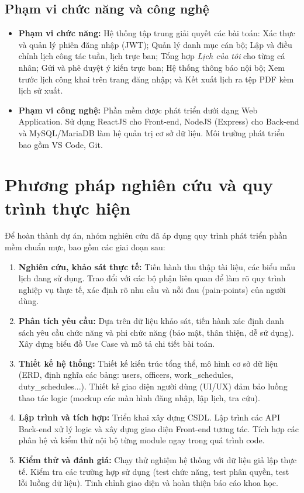 \documentclass[18pt,a4paper]{report}
\begin{document}
\subsection{Phạm vi chức năng và công nghệ}
\begin{itemize}[leftmargin=1.2cm]
    \item \textbf{Phạm vi chức năng:} Hệ thống tập trung giải quyết các bài toán: Xác thực và quản lý phiên đăng nhập (JWT); Quản lý danh mục cán bộ; Lập và điều chỉnh lịch công tác tuần, lịch trực ban; Tổng hợp \textit{Lịch của tôi} cho từng cá nhân; Gửi và phê duyệt ý kiến trực ban; Hệ thống thông báo nội bộ; Xem trước lịch công khai trên trang đăng nhập; và Kết xuất lịch ra tệp PDF kèm lịch sử xuất.
    \item \textbf{Phạm vi công nghệ:} Phần mềm được phát triển dưới dạng Web Application. Sử dụng ReactJS cho Front-end, NodeJS (Express) cho Back-end và MySQL/MariaDB làm hệ quản trị cơ sở dữ liệu. Môi trường phát triển bao gồm VS Code, Git.
\end{itemize}

\section{Phương pháp nghiên cứu và quy trình thực hiện}
Để hoàn thành dự án, nhóm nghiên cứu đã áp dụng quy trình phát triển phần mềm chuẩn mực, bao gồm các giai đoạn sau:
\begin{enumerate}[leftmargin=1.2cm]
    \item \textbf{Nghiên cứu, khảo sát thực tế:} Tiến hành thu thập tài liệu, các biểu mẫu lịch đang sử dụng. Trao đổi với các bộ phận liên quan để làm rõ quy trình nghiệp vụ thực tế, xác định rõ nhu cầu và nỗi đau (pain-points) của người dùng.
    \item \textbf{Phân tích yêu cầu:} Dựa trên dữ liệu khảo sát, tiến hành xác định danh sách yêu cầu chức năng và phi chức năng (bảo mật, thân thiện, dễ sử dụng). Xây dựng biểu đồ Use Case và mô tả chi tiết bài toán.
    \item \textbf{Thiết kế hệ thống:} Thiết kế kiến trúc tổng thể, mô hình cơ sở dữ liệu (ERD, định nghĩa các bảng: users, officers, work\_schedules, duty\_schedules...). Thiết kế giao diện người dùng (UI/UX) đảm bảo luồng thao tác logic (mockup các màn hình đăng nhập, lập lịch, tra cứu).
    \item \textbf{Lập trình và tích hợp:} Triển khai xây dựng CSDL. Lập trình các API Back-end xử lý logic và xây dựng giao diện Front-end tương tác. Tích hợp các phân hệ và kiểm thử nội bộ từng module ngay trong quá trình code.
    \item \textbf{Kiểm thử và đánh giá:} Chạy thử nghiệm hệ thống với dữ liệu giả lập thực tế. Kiểm tra các trường hợp sử dụng (test chức năng, test phân quyền, test lỗi luồng dữ liệu). Tinh chỉnh giao diện và hoàn thiện báo cáo khoa học.
\end{enumerate}
\end{document}
